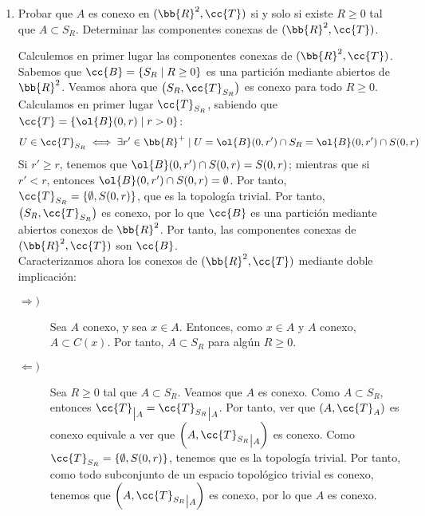 \documentclass[12pt]{article}
\newcommand{\T}[0]{\cc{T}}
\begin{document}
\begin{ejercicio}[4.5 puntos]
\begin{enumerate}
            \item Probar que $A$ es conexo en $(\bb{R}^2,\T)$ si y solo si existe $R\geq 0$ tal que $A\subset S_R$. Determinar
            las componentes conexas de $(\bb{R}^2,\T)$.

            Calculemos en primer lugar las componentes conexas de $(\bb{R}^2,\T)$. Sabemos que $\cc{B}= \{S_R\mid R\geq 0\}$ es una partición
            mediante abiertos de $\bb{R}^2$. Veamos ahora que $\left(S_R, \T_{S_R}\right)$ es conexo para todo $R\geq 0$. Calculamos en
            primer lugar $\T_{S_R}$, sabiendo que $\T=\{\ol{B}(0,r)\mid r>0\}$:
            \begin{equation*}
                U \in \T_{S_R} \iff \exists r'\in \bb{R}^+ \mid U = \ol{B}(0, r') \cap S_R = \ol{B}(0, r') \cap S(0,r)
            \end{equation*}
            Si $r'\geq r$, tenemos que $\ol{B}(0, r') \cap S(0,r) = S(0,r)$; mientras que si
            $r'<r$, entonces $\ol{B}(0, r') \cap S(0,r) = \emptyset$. Por tanto, $\T_{S_R} = \{\emptyset, S(0,r)\}$, que es la
            topología trivial. Por tanto, $\left(S_R, \T_{S_R}\right)$ es conexo,
            por lo que $\cc{B}$ es una partición mediante abiertos conexos de $\bb{R}^2$. Por tanto, las componentes conexas de
            $(\bb{R}^2,\T)$ son $\cc{B}$.\\

            Caracterizamos ahora los conexos de $(\bb{R}^2,\T)$ mediante doble implicación:
            \begin{description}
                \item[$\Longrightarrow)$] Sea $A$ conexo, y sea $x\in A$. Entonces, como $x\in A$ y $A$ conexo, $A\subset C(x)$.
                Por tanto, $A\subset S_R$ para algún $R\geq 0$.

                \item[$\Longleftarrow)$] Sea $R\geq 0$ tal que $A\subset S_R$. Veamos que $A$ es conexo. Como $A\subset S_R$,
                entonces $\T_{\big| A} = {\T_{S_R}}_{\big |A}$. Por tanto, ver que $\left(A, \T_A\right)$ es conexo  
                equivale a ver que $\left(A, {\T_{S_R}}_{\big |A}\right)$ es conexo. Como $\T_{S_R} = \{\emptyset, S(0,r)\}$, tenemos que es la topología
                trivial. Por tanto, como todo subconjunto de un espacio topológico trivial es conexo, tenemos que $\left(A, {\T_{S_R}}_{\big |A}\right)$
                es conexo, por lo que $A$ es conexo.
            \end{description}


\end{enumerate}
\end{ejercicio}
\end{document}
